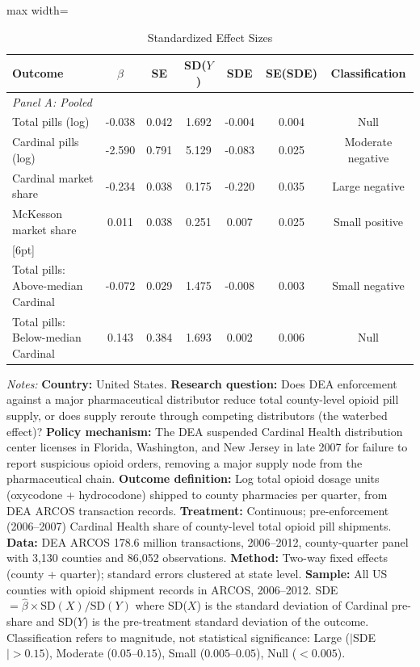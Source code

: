 \begin{table}[htbp]
\centering
\caption{Standardized Effect Sizes}
\label{tab:sde}
\begin{adjustbox}{max width=\textwidth}
\begin{tabular}{lcccccc}
\hline\hline
Outcome & $\hat{\beta}$ & SE & SD($Y$) & SDE & SE(SDE) & Classification \\
\hline
\multicolumn{7}{l}{\textit{Panel A: Pooled}} \\[3pt]
Total pills (log) & -0.038 & 0.042 & 1.692 & -0.004 & 0.004 & Null \\
Cardinal pills (log) & -2.590 & 0.791 & 5.129 & -0.083 & 0.025 & Moderate negative \\
Cardinal market share & -0.234 & 0.038 & 0.175 & -0.220 & 0.035 & Large negative \\
McKesson market share & 0.011 & 0.038 & 0.251 & 0.007 & 0.025 & Small positive \\
{}[6pt]
\multicolumn{7}{l}{\textit{Panel B: Heterogeneous (sample splits)}} \\[3pt]
Total pills: Above-median Cardinal & -0.072 & 0.029 & 1.475 & -0.008 & 0.003 & Small negative \\
Total pills: Below-median Cardinal & 0.143 & 0.384 & 1.693 & 0.002 & 0.006 & Null \\
\hline\hline
\end{tabular}
\end{adjustbox}
\par\vspace{3pt}\raggedright\small
\textit{Notes:} \textbf{Country:} United States. \textbf{Research question:} Does DEA enforcement against a major pharmaceutical distributor reduce total county-level opioid pill supply, or does supply reroute through competing distributors (the waterbed effect)? \textbf{Policy mechanism:} The DEA suspended Cardinal Health distribution center licenses in Florida, Washington, and New Jersey in late 2007 for failure to report suspicious opioid orders, removing a major supply node from the pharmaceutical chain. \textbf{Outcome definition:} Log total opioid dosage units (oxycodone + hydrocodone) shipped to county pharmacies per quarter, from DEA ARCOS transaction records. \textbf{Treatment:} Continuous; pre-enforcement (2006--2007) Cardinal Health share of county-level total opioid pill shipments. \textbf{Data:} DEA ARCOS 178.6 million transactions, 2006--2012, county-quarter panel with 3,130 counties and 86,052 observations. \textbf{Method:} Two-way fixed effects (county + quarter); standard errors clustered at state level. \textbf{Sample:} All US counties with opioid shipment records in ARCOS, 2006--2012. SDE $= \hat{\beta} \times \text{SD}(X) / \text{SD}(Y)$ where SD($X$) is the standard deviation of Cardinal pre-share and SD($Y$) is the pre-treatment standard deviation of the outcome. Classification refers to magnitude, not statistical significance: Large ($|$SDE$| > 0.15$), Moderate ($0.05$--$0.15$), Small ($0.005$--$0.05$), Null ($< 0.005$).
\end{table}
